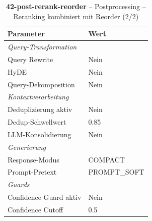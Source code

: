 \begin{table}[H]
\centering
\small
\setlength{\tabcolsep}{4pt}
\begin{tabular}{lp{8cm}}
\toprule
\textbf{Parameter} & \textbf{Wert} \\
\midrule
\multicolumn{2}{l}{\textit{Query-Transformation}} \\
\midrule
\quad Query Rewrite & Nein \\
\quad HyDE & Nein \\
\quad Query-Dekomposition & Nein \\
\midrule
\multicolumn{2}{l}{\textit{Kontextverarbeitung}} \\
\midrule
\quad Deduplizierung aktiv & Nein \\
\quad Dedup-Schwellwert & 0.85 \\
\quad LLM-Konsolidierung & Nein \\
\midrule
\multicolumn{2}{l}{\textit{Generierung}} \\
\midrule
\quad Response-Modus & COMPACT \\
\quad Prompt-Pretext & PROMPT\_SOFT \\
\midrule
\multicolumn{2}{l}{\textit{Guards}} \\
\midrule
\quad Confidence Guard aktiv & Nein \\
\quad Confidence Cutoff & 0.5 \\
\bottomrule
\end{tabular}
\caption{\textbf{42-post-rerank-reorder} -- Postprocessing -- Reranking kombiniert mit Reorder (2/2)}
\label{tab:config_42_post_rerank_reorder_b}
\end{table}